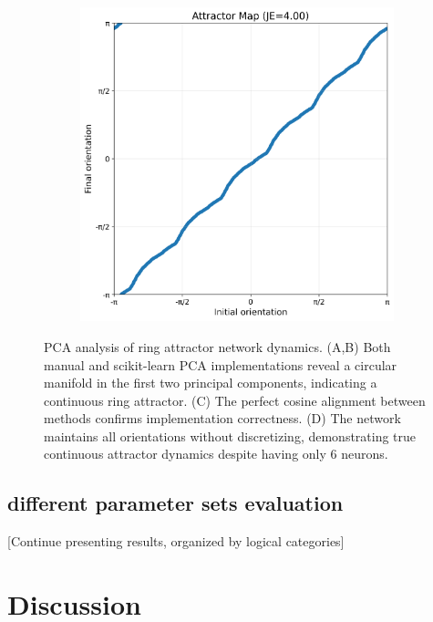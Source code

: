 \documentclass[11pt,a4paper]{article}
\begin{document}
\begin{figure}[H]
\begin{subfigure}{0.45\textwidth}
    \includegraphics[width=\textwidth]{orientation_comparison.png}
\end{subfigure}

\caption{PCA analysis of ring attractor network dynamics. (A,B) Both manual and scikit-learn PCA implementations reveal a circular manifold in the first two principal components, indicating a continuous ring attractor. (C) The perfect cosine alignment between methods confirms implementation correctness. (D) The network maintains all orientations without discretizing, demonstrating true continuous attractor dynamics despite having only 6 neurons.}
\label{fig:pca_analysis}
\end{figure}


\subsection{different parameter sets evaluation}

[Continue presenting results, organized by logical categories]


\section{Discussion}
\end{document}
